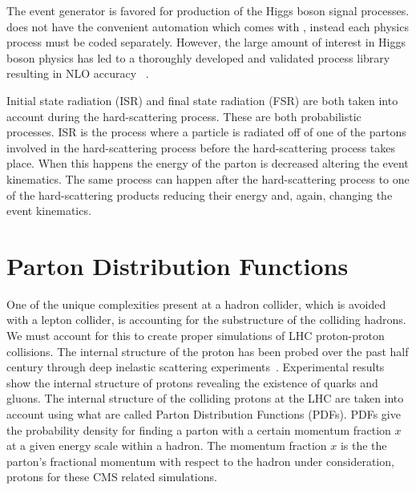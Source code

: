 The \POWHEG event generator is favored for production of the Higgs boson signal processes.
\POWHEG does not have the convenient automation which comes with \MGAMCNLO, instead each
physics process must be coded separately. However, the large amount of interest in Higgs boson physics
has led to a thoroughly developed and validated process library resulting in NLO accuracy
~\cite{Alioli:2010xa,Alioli:2008tz,Brein:2003wg,Ravindran:2003um,deFlorian:2012mx}.

Initial state radiation (ISR) and final state radiation (FSR) are both taken into account
during the hard-scattering process. These are both probabilistic processes.
ISR is the process where a particle is radiated off of
one of the partons involved in the hard-scattering process before the hard-scattering process
takes place. When this happens the energy of the parton is decreased altering the event
kinematics. The same process can happen after the hard-scattering process to one of the
hard-scattering products reducing their energy and, again, changing the event kinematics.



\section{Parton Distribution Functions}
One of the unique complexities present at a hadron collider, which is avoided with a
lepton collider, is accounting for the substructure of the colliding hadrons. 
We must account for this to create proper simulations
of LHC proton-proton collisions. The internal structure of the proton
has been probed over the past half century through deep inelastic scattering
experiments~\cite{Breidenbach:1969kd, PhysRevLett.23.930}.
Experimental results show the internal structure of protons revealing the existence of
quarks and gluons. The internal structure of the colliding protons at the LHC are taken into
account using what are called Parton Distribution Functions (PDFs). PDFs give the probability
density for finding a parton with a certain momentum fraction $x$ at a given
energy scale within a hadron. The momentum fraction $x$ is the the parton's fractional momentum with respect
to the hadron under consideration, protons for these CMS related simulations. 


